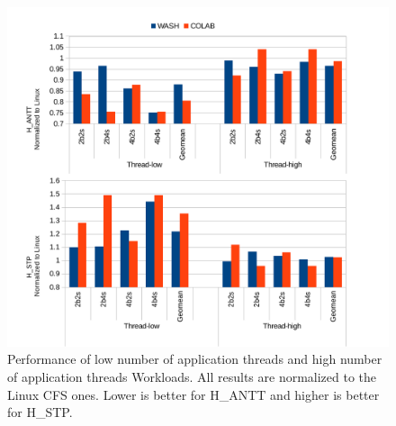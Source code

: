 \begin{figure}
\centering
\includegraphics[scale=0.55]{figures/nthread.pdf}
\caption{Performance of low number of application threads and high number of application threads Workloads. All results are normalized to the Linux CFS ones. Lower is better for H\_ANTT and higher is better for H\_STP.}
\label{nthread}
\end{figure}

